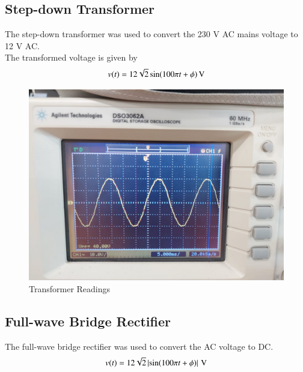 \documentclass[journal,12pt,twocolumn]{IEEEtran}
\begin{document}
\subsection{Step-down Transformer}
The step-down transformer was used to convert the 230 V AC mains voltage to 12 V AC\@. \\
The transformed voltage is given by
\[ v(t) = \SI[parse-numbers=false]{12\sqrt{2}\sin(100\pi t + \phi)}{\volt} \]
\begin{figure}[!htb]
    \includegraphics[width=\columnwidth]{figs/transformer}
    \caption{Transformer Readings}
    \label{fig:transformer}
\end{figure}

\subsection{Full-wave Bridge Rectifier}
The full-wave bridge rectifier was used to convert the AC voltage to DC\@.
\[ v(t) = \SI[parse-numbers=false]{12\sqrt{2} \abs{\sin(100\pi t + \phi)}}{\volt} \]
\end{document}
